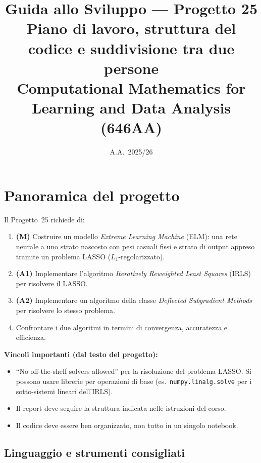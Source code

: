 \documentclass[a4paper,11pt]{article}
\title{\textbf{Guida allo Sviluppo --- Progetto 25}\\[6pt]
\large Piano di lavoro, struttura del codice e suddivisione tra due persone\\[8pt]
\normalsize Computational Mathematics for Learning and Data Analysis (646AA)}
\author{}
\date{A.A.\ 2025/26}
\begin{document}
\maketitle
\tableofcontents
\newpage

\section{Panoramica del progetto}
\label{sec:overview}

Il Progetto~25 richiede di:
\begin{enumerate}
  \item \textbf{(M)} Costruire un modello \emph{Extreme Learning Machine} (ELM): una rete neurale a uno strato nascosto con pesi casuali fissi e strato di output appreso tramite un problema LASSO ($L_1$-regolarizzato).
  \item \textbf{(A1)} Implementare l'algoritmo \emph{Iteratively Reweighted Least Squares} (IRLS) per risolvere il LASSO.
  \item \textbf{(A2)} Implementare un algoritmo della classe \emph{Deflected Subgradient Methods} per risolvere lo stesso problema.
  \item Confrontare i due algoritmi in termini di convergenza, accuratezza e efficienza.
\end{enumerate}

\begin{warnbox}
\textbf{Vincoli importanti (dal testo del progetto):}
\begin{itemize}[nosep]
  \item ``No off-the-shelf solvers allowed'' per la risoluzione del problema LASSO. Si possono usare librerie per operazioni di base (es.\ \texttt{numpy.linalg.solve} per i sotto-sistemi lineari dell'IRLS).
  \item Il report deve seguire la struttura indicata nelle istruzioni del corso.
  \item Il codice deve essere ben organizzato, non tutto in un singolo notebook.
\end{itemize}
\end{warnbox}

\subsection{Linguaggio e strumenti consigliati}
\label{subsec:tools}
\end{document}
